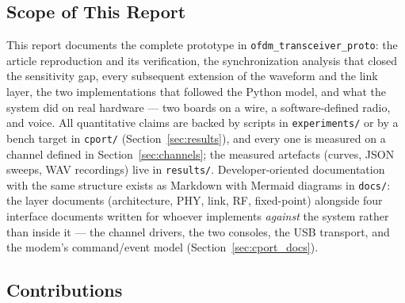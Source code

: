\subsection{Scope of This Report}

This report documents the complete prototype in
\texttt{ofdm\_transceiver\_proto}: the article reproduction and its
verification, the synchronization analysis that closed the sensitivity
gap, every subsequent extension of the waveform and the link layer,
the two implementations that followed the Python model, and what the
system did on real hardware --- two boards on a wire, a
software-defined radio, and voice.  All quantitative claims are backed
by scripts in \texttt{experiments/} or by a bench target in
\texttt{cport/} (Section~\ref{sec:results}), and every one is
measured on a channel defined in Section~\ref{sec:channels}; the
measured artefacts (curves, JSON sweeps, WAV recordings) live in
\texttt{results/}.  Developer-oriented documentation with the same
structure exists as Markdown with Mermaid diagrams in \texttt{docs/}:
the layer documents (architecture, PHY, link, RF, fixed-point)
alongside four interface documents written for whoever implements
\emph{against} the system rather than inside it --- the channel
drivers, the two consoles, the USB transport, and the modem's
command/event model (Section~\ref{sec:cport_docs}).

\subsection{Contributions}

